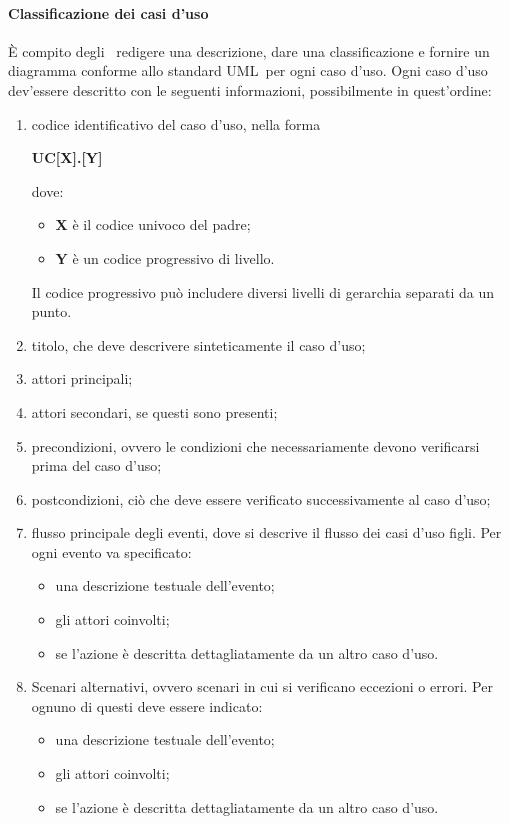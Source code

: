 \documentclass[../NormeProgetto.tex]{subfiles}
\begin{document}
				\paragraph{Classificazione dei casi d'uso}
					È compito degli \analisti\ redigere una descrizione, dare una classificazione e fornire un diagramma conforme allo standard UML\g\ per ogni caso d'uso. Ogni caso d'uso dev'essere descritto con le seguenti informazioni, possibilmente in quest'ordine:
					\begin{enumerate}
						\item codice identificativo del caso d'uso, nella forma \begin{center}\textbf{UC[X].[Y]}\end{center} dove:
						\begin{itemize}
							\item \textbf{X} è il codice univoco del padre;
							\item \textbf{Y} è un codice progressivo di livello.
						\end{itemize}
						Il codice progressivo può includere diversi livelli di gerarchia separati da un punto.
						\item titolo, che deve descrivere sinteticamente il caso d'uso;
						\item attori principali;
						\item attori secondari, se questi sono presenti;
						\item precondizioni, ovvero le condizioni che necessariamente devono verificarsi prima del caso d'uso;
						\item postcondizioni, ciò che deve essere verificato successivamente al caso d'uso;
						\item flusso principale degli eventi, dove si descrive il flusso dei casi d'uso figli. Per ogni evento va specificato:
						\begin{itemize}
							\item una descrizione testuale dell'evento;
							\item gli attori coinvolti;
							\item se l'azione è descritta dettagliatamente da un altro caso d'uso.
						\end{itemize}
						\item Scenari alternativi, ovvero scenari in cui si verificano eccezioni o errori. Per ognuno di questi deve essere indicato:
							\begin{itemize}
								\item una descrizione testuale dell'evento;
								\item gli attori coinvolti;
								\item se l'azione è descritta dettagliatamente da un altro caso d'uso.
							\end{itemize}
					\end{enumerate}
\end{document}
